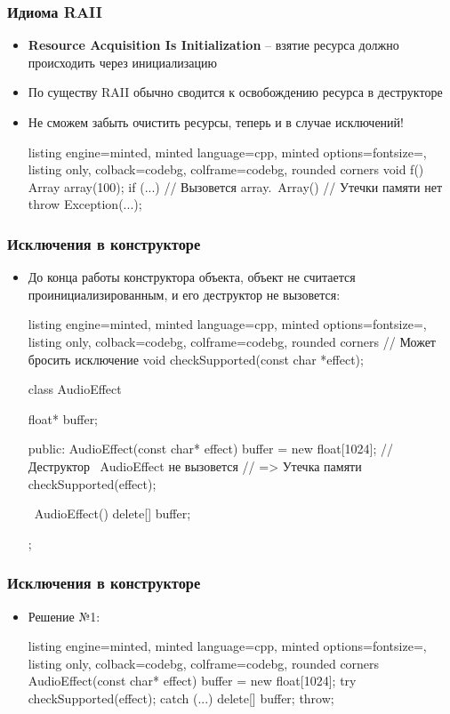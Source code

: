 \documentclass[10pt]{beamer}
\begin{document}
\begin{frame}[fragile]
\frametitle{Идиома RAII}
\begin{itemize}
\item \textbf{Resource Acquisition Is Initialization} -- взятие ресурса должно происходить через инициализацию
\pause
\item По существу RAII обычно сводится к освобождению ресурса в деструкторе
\pause
\item Не сможем забыть очистить ресурсы\pause, теперь и в случае исключений!
\begin{tcblisting}{listing engine=minted, minted language=cpp, minted options={fontsize=\scriptsize}, listing only, colback=codebg, colframe=codebg, rounded corners}
void f() {
  Array array(100);
  if (...) {
    // Вызовется array.~Array()
    // Утечки памяти нет
    throw Exception(...);
  }
}
\end{tcblisting}
\end{itemize}
\end{frame}

\begin{frame}[fragile]
\frametitle{Исключения в конструкторе}
\begin{itemize}
\item До конца работы конструктора объекта, объект не считается проинициализированным, и его деструктор не вызовется:
\begin{tcblisting}{listing engine=minted, minted language=cpp, minted options={fontsize=\scriptsize}, listing only, colback=codebg, colframe=codebg, rounded corners}
// Может бросить исключение
void checkSupported(const char *effect);

class AudioEffect {
  float* buffer;

public:
  AudioEffect(const char* effect) {
    buffer = new float[1024];
    // Деструктор ~AudioEffect не вызовется
    // => Утечка памяти
    checkSupported(effect);
  }

  ~AudioEffect() {
    delete[] buffer;
  }
};
\end{tcblisting}
\end{itemize}
\end{frame}

\begin{frame}[fragile]
\frametitle{Исключения в конструкторе}
\begin{itemize}
\item Решение №1:
\begin{tcblisting}{listing engine=minted, minted language=cpp, minted options={fontsize=\scriptsize}, listing only, colback=codebg, colframe=codebg, rounded corners}
  AudioEffect(const char* effect) {
    buffer = new float[1024];
    try {
      checkSupported(effect);
    }
    catch (...) {
      delete[] buffer;
      throw;
    }
  }
\end{tcblisting}
\end{itemize}
\end{frame}
\end{document}
